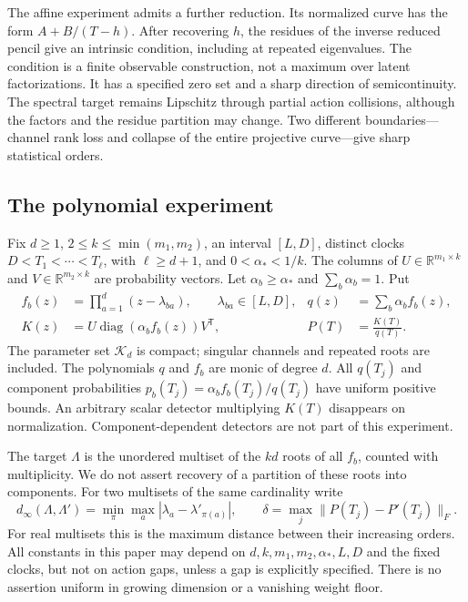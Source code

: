 \documentclass[11pt,reqno]{amsart}
\numberwithin{equation}{section}
\theoremstyle{definition}\newtheorem{definition}[theorem]{Definition}
\theoremstyle{remark}\newtheorem{remark}[theorem]{Remark}
\newcommand{\R}{\mathbb R}
\newcommand{\diag}{\operatorname{diag}}
\newcommand{\cK}{\mathcal K}
\begin{document}
The affine experiment admits a further reduction. Its normalized curve
has the form $A+B/(T-h)$. After recovering $h$, the residues of the
inverse reduced pencil give an intrinsic condition, including at
repeated eigenvalues. The condition is a finite observable construction,
not a maximum over latent factorizations. It has a specified zero set
and a sharp direction of semicontinuity. The spectral target remains
Lipschitz through partial action collisions, although the factors and
the residue partition may change. Two different boundaries---channel
rank loss and collapse of the entire projective curve---give sharp
statistical orders.

\subsection{The polynomial experiment}
Fix $d\ge1$, $2\le k\le\min(m_1,m_2)$, an interval $[L,D]$, distinct
clocks $D<T_1<\cdots<T_\ell$, with $\ell\ge d+1$, and
$0<\alpha_*<1/k$. The columns of
$U\in\R^{m_1\times k}$ and $V\in\R^{m_2\times k}$ are probability
vectors. Let $\alpha_b\ge\alpha_*$ and $\sum_b\alpha_b=1$. Put
\begin{align}
 f_b(z)&=\prod_{a=1}^d(z-\lambda_{ba}),\qquad \lambda_{ba}\in[L,D],
       &q(z)&=\sum_b\alpha_b f_b(z),\nonumber\\
 K(z)&=U\diag(\alpha_b f_b(z))V^{\mathsf T},
       &P(T)&=\frac{K(T)}{q(T)}.                  \label{eq:model}
\end{align}
The parameter set $\cK_d$ is compact; singular channels and repeated
roots are included. The polynomials $q$ and $f_b$ are monic of degree
$d$. All $q(T_j)$ and component probabilities
$p_b(T_j)=\alpha_b f_b(T_j)/q(T_j)$ have uniform positive bounds.
An arbitrary scalar detector multiplying $K(T)$ disappears on
normalization. Component-dependent detectors are not part of this
experiment.

The target $\Lambda$ is the unordered multiset of the $kd$ roots of all
$f_b$, counted with multiplicity. We do not assert recovery of a
partition of these roots into components. For two multisets of the same
cardinality write
\[
 d_\infty(\Lambda,\Lambda')=
       \min_\pi\max_a|\lambda_a-\lambda'_{\pi(a)}|,
 \qquad \delta=\max_j\|P(T_j)-P'(T_j)\|_F.
\]
For real multisets this is the maximum distance between their increasing
orders. All constants in this paper may depend on
$d,k,m_1,m_2,\alpha_*,L,D$ and the fixed clocks, but not on action gaps,
unless a gap is explicitly specified. There is no assertion uniform in
growing dimension or a vanishing weight floor.
\end{document}
